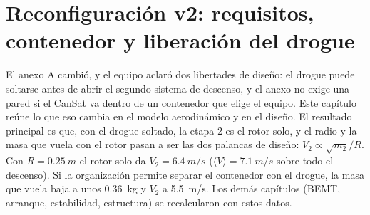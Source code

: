\chapter[Reconfiguración v2: contenedor y liberación]{Reconfiguración v2: requisitos, contenedor y liberación del drogue}\label{cap:arq}

El anexo A cambió, y el equipo aclaró dos libertades de diseño: el drogue puede soltarse
antes de abrir el segundo sistema de descenso, y el anexo no exige una pared si el
CanSat va dentro de un contenedor que elige el equipo. Este capítulo reúne lo que eso cambia
en el modelo aerodinámico y en el diseño. El resultado principal es que, con el drogue
soltado, la etapa 2 es el rotor solo, y el radio y la masa que vuela con el rotor pasan a
ser las dos palancas de diseño: $V_2\propto\sqrt{m_2}/R$. Con $R=\SI{0.25}{m}$ el rotor
solo da $V_2=\SI{6.4}{m/s}$ ($\langle V\rangle=\SI{7.1}{m/s}$ sobre todo el descenso). Si la
organización permite separar el contenedor con el drogue, la masa que vuela baja a unos
\SI{0.36}{kg} y $V_2$ a \SI{5.5}{m/s}. Los demás capítulos (BEMT, arranque, estabilidad,
estructura) se recalcularon con estos datos.

